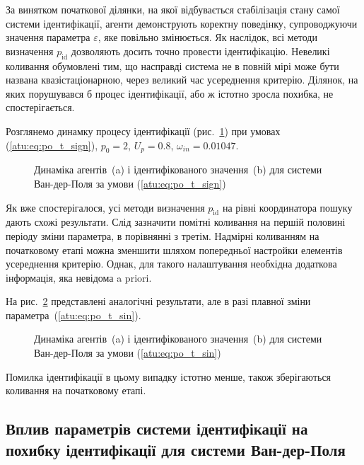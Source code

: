 За винятком початкової ділянки, на якої відбувається
стабілізація стану самої системи ідентифікації, агенти
демонструють коректну поведінку, супроводжуючи значення параметра
$\varepsilon$, яке повільно змінюється.
Як наслідок, всі методи визначення
$p_\mathrm{id}$ дозволяють досить точно провести
ідентифікацію. Невеликі коливання обумовлені тим, що насправді
система не в повній мірі може бути названа квазістаціонарною,
через великий час усереднення критерію. Ділянок, на яких
порушувався б процес ідентифікації, або ж істотно зросла
похибка, не спостерігається.

Розглянемо динамку процесу ідентифікації (рис.~\ref{atu:f:vdp_id1_sign})
при умовах (\ref{atu:eq:po_t_sign}),
$p_0 = 2$,
$U_p = 0.8$,
$\omega_{in} = 0.01047$.

\begin{figure}[ht!]
  \caption{Динаміка агентів~(a) і ідентифікованого значення~(b) для системи Ван-дер-Поля за умови (\ref{atu:eq:po_t_sign})}
\label{atu:f:vdp_id1_sign}
\end{figure}

Як вже спостерігалося, усі методи визначення
$p_\mathrm{id}$ на рівні координатора пошуку дають схожі
результати. Слід зазначити помітні коливання на першій половині
періоду зміни параметра, в порівнянні з третім. Надмірні
коливанням на початковому етапі можна зменшити шляхом
попередньої настройки елементів усереднення критерію. Однак,
для такого налаштування необхідна додаткова інформація, яка
невідома a priori.

На рис.~\ref{atu:f:vdp_id1_sin} представлені аналогічні результати, але
в разі плавної зміни параметра~(\ref{atu:eq:po_t_sin}).

\begin{figure}[ht!]
  \caption{Динаміка агентів~(a) і ідентифікованого значення~(b) для системи Ван-дер-Поля за умови (\ref{atu:eq:po_t_sin})}
\label{atu:f:vdp_id1_sin}
\end{figure}

Помилка ідентифікації в цьому випадку істотно менше, також
зберігаються коливання на початковому етапі.



\subsection{Вплив параметрів системи ідентифікації на похибку ідентифікації для системи Ван-дер-Поля} %

